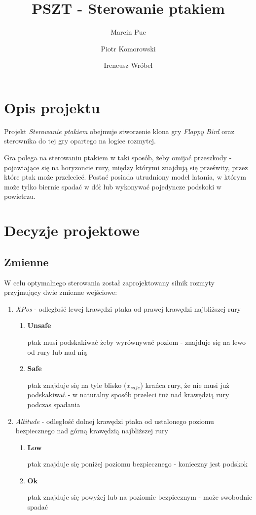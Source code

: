 \documentclass{article}
\title{PSZT - Sterowanie ptakiem}
\author{
  Marcin Puc
  \and
  Piotr Komorowski
  \and
  Ireneusz Wróbel
}
\date{}
\begin{document}
\maketitle

\section {Opis projektu}

Projekt \emph{Sterowanie ptakiem} obejmuje stworzenie klona gry \emph{Flappy
  Bird} oraz sterownika do tej gry opartego na logice rozmytej.

Gra polega na sterowaniu ptakiem w taki sposób, żeby omijać przeszkody -
pojawiające się na horyzoncie rury, między którymi znajdują się prześwity, przez
które ptak może przelecieć. Postać posiada utrudniony model latania, w którym
może tylko biernie spadać w dół lub wykonywać pojedyncze podskoki w powietrzu.

\section {Decyzje projektowe}

\subsection{Zmienne}

W celu optymalnego sterowania został zaprojektowany silnik rozmyty przyjmujący
dwie zmienne wejściowe:

\begin{enumerate}
\item \emph{XPos} - odległość lewej krawędzi ptaka od prawej krawędzi najbliższej rury
  \begin{enumerate}
  \item \textbf{Unsafe}

    ptak musi podskakiwać żeby wyrównywać poziom - znajduje się
    na lewo od rury lub nad nią

  \item \textbf{Safe}

    ptak znajduje się na tyle blisko ($x_{safe}$) krańca rury, że nie musi już podskakiwać -
    w naturalny sposób przeleci tuż nad krawędzią rury podczas spadania 

  \end{enumerate}
\item \emph{Altitude} - odległość dolnej krawędzi ptaka od ustalonego poziomu
  bezpiecznego nad górną krawędzią najbliższej rury
  \begin{enumerate}
  \item \textbf{Low}

    ptak znajduje się poniżej poziomu bezpiecznego - konieczny jest podskok

  \item \textbf{Ok}

    ptak znajduje się powyżej lub na poziomie bezpiecznym - może swobodnie spadać

  \end{enumerate}
\end{enumerate}
\end{document}
